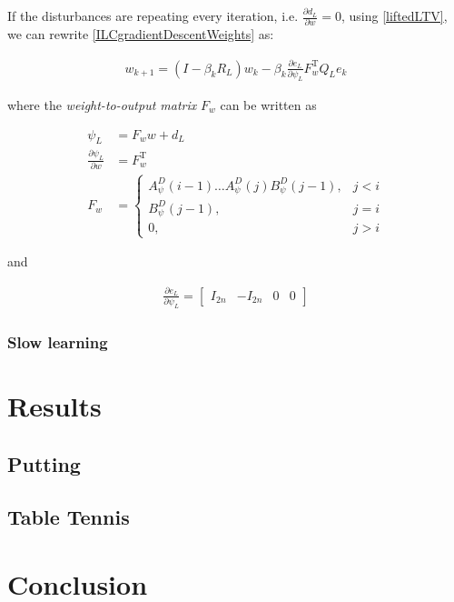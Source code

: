 \documentclass[10pt,a4paper]{article}
\newcommand{\error}{e} %
\newcommand{\linDist}{d} %
\newcommand{\fullvec}{\psi} %
\newcommand{\weights}{w} %
\begin{document}
If the disturbances are repeating every iteration, i.e. $\frac{\partial{\linDist_L}}{\partial{\weights}} = 0$, using \eqref{liftedLTV}, we can rewrite \eqref{ILCgradientDescentWeights} as:

\begin{equation}
\begin{aligned}
\weights_{k+1} = (I - \beta_kR_L)\weights_k - \beta_k\frac{\partial{\error_L}}{\partial{\fullvec_L}}F_{\weights}^\mathrm{T}Q_L\error_k
\end{aligned}
\label{ILCgradientDescentWeights2}
\end{equation}

where the \emph{weight-to-output matrix} $F_{\weights}$ can be written as

\begin{equation}
\begin{aligned}
\fullvec_L &= F_{\weights}\weights + \linDist_L \\
\frac{\partial{\fullvec_L}}{\partial{\weights}} &= F_{\weights}^{\mathrm{T}} \\
F_{\weights} &= \left \{
\begin{array}{cc}
A^{D}_{\fullvec}(i-1)\ldots A^{D}_{\fullvec}(j)B^{D}_{\fullvec}(j-1), & j < i \\ 
B^{D}_{\fullvec}(j-1), & j = i \\
0, & j > i 
\end{array} \right.
\end{aligned}
\label{weightToOutputMatrix}
\end{equation}

and

\begin{equation}
\begin{aligned}
\frac{\partial{\error_L}}{\partial{\fullvec_L}} =
\begin{bmatrix}
  I_{2n} & -I_{2n} & 0 & 0
 \end{bmatrix}
\end{aligned}
\end{equation}

\subsubsection{Slow learning}

\section{Results}

\subsection{Putting}

\subsection{Table Tennis}

\section{Conclusion}


%
%

\end{document}
